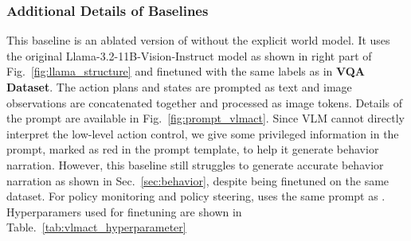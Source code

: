     
\subsubsection{Additional Details of Baselines}\hfill
\label{sec:appendix_additional_baselines}

    \para{\vlmact} This baseline is an ablated version of \ours without the explicit world model. It uses the original Llama-3.2-11B-Vision-Instruct model as shown in right part of Fig.~\ref{fig:llama_structure} and finetuned with the same labels as in \textbf{VQA Dataset}. The action plans and states are prompted as text and image observations are concatenated together and processed as image tokens. Details of the prompt are available in Fig.~\ref{fig:prompt_vlmact}. Since VLM cannot directly interpret the low-level action control, we give some privileged information in the prompt, marked as red in the prompt template, to help it generate behavior narration. However, this baseline still struggles to generate accurate behavior narration as shown in Sec.~\ref{sec:behavior}, despite being finetuned on the same dataset. For policy monitoring and policy steering, \vlmact uses the same prompt as \ours. Hyperparamers used for finetuning are shown in Table.~\ref{tab:vlmact_hyperparameter}
   
